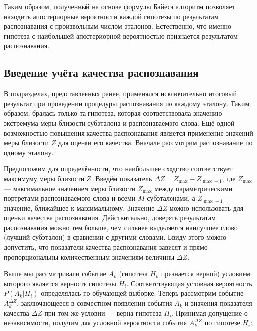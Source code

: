 Таким образом, полученный на основе формулы Байеса алгоритм позволяет находить апостериорные вероятности каждой гипотезы по результатам распознавания с произвольным числом эталонов.
Естественно, что именно гипотеза с наибольшей апостериорной вероятностью признается результатом распознавания.


\subsection{Введение учёта качества распознавания} \label{sect2_5_4}

В подразделах, представленных ранее, применялся исключительно итоговый результат при проведении процедуры распознавания по каждому эталону.
Таким образом, бралась только та гипотеза, которая соответствовала значению экстремума меры близости субэталона и распознаваемого слова.
Ещё одной возможностью повышения качества распознавания является применение значений меры близости $Z$ для оценки его качества.
Вначале рассмотрим распознавание по одному эталону.

Предположим для определённости, что наибольшее сходство соответствует максимуму меры близости $Z$.
Введём показатель $\Delta Z = Z_{\max} - Z_{\max - 1}$, где $Z_{\max}$ --- максимальное значением меры близости $Z_{\max}$ между параметрическими портретами распознаваемого слова и всеми $M$ субэталонами, а $Z_{\max - 1}$ --- значение, ближайшее к максимальному.
Значение $\Delta Z$ можно использовать для оценки качества распознавания.
Действительно, доверять результатам распознавания можно тем больше, чем сильнее выделяется наилучшее слово (лучший субэталон) в сравнении с другими словами.
Ввиду этого можно допустить, что показатели качества распознавания зависят и прямо пропорциональны количественным значениям величины $\Delta Z$.

Выше мы рассматривали событие $A_k$ (гипотеза $H_k$ признается верной) условием которого является верность гипотезы $H_i$.
Соответствующая условная вероятность $P(A_{k}|H_i)$ определялась по обучающей выборке.
Теперь рассмотрим событие $A_k^{\Delta Z}$, заключающееся в совместном появлении события $A_k$ и значения показателя качества $\Delta Z$ при том же условии --- верна гипотеза $H_i$.
Принимая допущение о независимости, получим для условной вероятности события $A_k^{\Delta Z}$ по гипотезе $H_i$:

